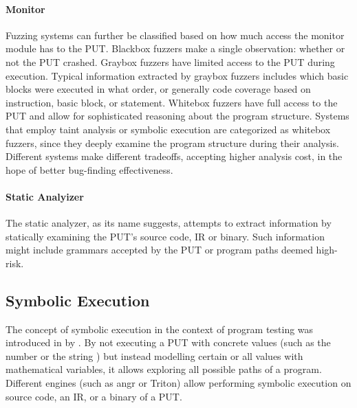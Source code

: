 \documentclass{article}
\begin{document}
\begin{multicols}{2}
    \paragraph{Monitor}
    Fuzzing systems can further be classified based on how much access the monitor module has to the PUT. Blackbox fuzzers make a single observation: whether or not the PUT crashed. Graybox fuzzers have limited access to the PUT during execution. Typical information extracted by graybox fuzzers includes which basic blocks were executed in what order, or generally code coverage based on instruction, basic block, or statement. Whitebox fuzzers have full access to the PUT and allow for sophisticated reasoning about the program structure. Systems that employ taint analysis or symbolic execution are categorized as whitebox fuzzers, since they deeply examine the program structure during their analysis. Different systems make different tradeoffs, accepting higher analysis cost, in the hope of better bug-finding effectiveness.\cite{EvaluatingFuzzTesting}

    \paragraph{Static Analyizer}
    The static analyzer, as its name suggests, attempts to extract information by statically examining the PUT's source code, IR or binary. Such information might include grammars accepted by the PUT or program paths deemed high-risk.

    \subsection{Symbolic Execution}
    \label{SymbolicExecution}
    The concept of symbolic execution in the context of program testing was introduced in \citeyear{Symbex} by \citeauthor{Symbex}.\cite{Symbex} By not executing a PUT with concrete values (such as the number  or the string ) but instead modelling certain or all values with mathematical variables, it allows exploring all possible paths of a program. Different engines (such as angr\cite{angr} or Triton\cite{Triton}) allow performing symbolic execution on source code, an IR, or a binary of a PUT.


\end{multicols}
\end{document}
